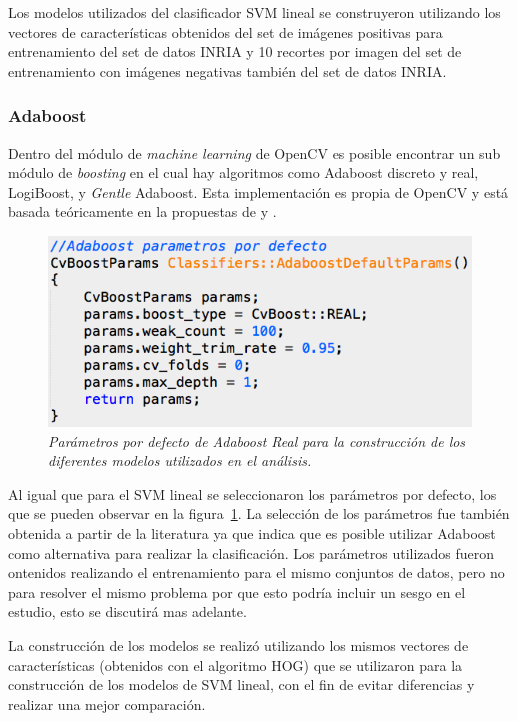 Los modelos utilizados del clasificador SVM lineal se construyeron utilizando los vectores de características obtenidos del set de imágenes positivas para entrenamiento del set de datos INRIA y 10 recortes por imagen del set de entrenamiento con imágenes negativas también del set de datos INRIA.

\subsubsection{Adaboost}
\label{propuestas:adaboost}

Dentro del módulo de \textit{machine learning} de OpenCV es posible encontrar un sub módulo de \textit{boosting} en el cual hay algoritmos como Adaboost discreto y real, LogiBoost, y \textit{Gentle} Adaboost. Esta implementación es propia de OpenCV y está basada teóricamente en la propuestas de \cite{Hastie2005} y \cite{Friedman2000}.


\begin{figure}[htc]
  \centering
  \includegraphics[scale=.6]{images/boostparams}
  \caption{\em Parámetros por defecto de Adaboost Real para la construcción de los diferentes modelos utilizados en el análisis.  }  
  \label{fig:boostparams}
\end{figure}

Al igual que para el SVM lineal se seleccionaron los parámetros por defecto, los que se pueden observar en la figura~\ref{fig:boostparams}. La selección de los parámetros fue también obtenida a partir de la literatura \citep{Zhu2006} ya que \cite{dalal2006} indica que es posible utilizar Adaboost como alternativa para realizar la clasificación. Los parámetros utilizados fueron ontenidos realizando el entrenamiento para el mismo conjuntos de datos, pero no para resolver el mismo problema por que esto podría incluir un sesgo en el estudio, esto se discutirá mas adelante.

La construcción de los modelos se realizó utilizando los mismos vectores de características (obtenidos con el algoritmo HOG) que se utilizaron para la construcción de los modelos de SVM lineal, con el fin de evitar diferencias y realizar una mejor comparación.

